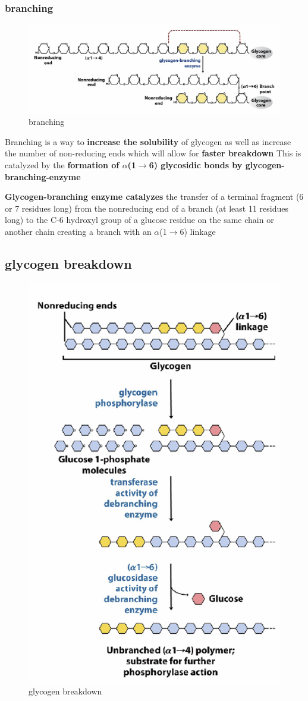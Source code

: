 \documentclass[../main.tex]{subfiles}
\begin{document}
\subsubsection{branching}
\begin{figure}[H]
    \centering
    \includegraphics[width=\linewidth]{branching.png}
    \caption{branching}
    \label{fig:enter-label}
\end{figure}

Branching is a way to \textbf{increase the solubility} of glycogen as well as increase the number of non-reducing ends which will allow for \textbf{faster breakdown} This is catalyzed by the \textbf{formation of  $\alpha$(1$\rightarrow$6) glycosidic bonds by \gls{glycogen-branching-enzyme}}
\par
\textbf{Glycogen-branching enzyme catalyzes} the transfer of a terminal fragment (6 or 7 residues long) from the nonreducing end of a branch (at least 11 residues long) to the C-6 hydroxyl group of a glucose residue on the same chain or another chain creating a branch with an $\alpha$(1$\rightarrow$6) linkage

\subsection{glycogen breakdown}
\begin{figure}[H]
    \centering
    \includegraphics[width=0.4\linewidth]{breakdownGlycogen.png}
    \caption{glycogen breakdown}
    \label{fig:enter-label}
\end{figure}
\end{document}
